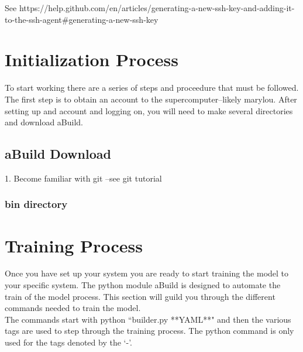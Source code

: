\documentclass{article}
\begin{document}
See https://help.github.com/en/articles/generating-a-new-ssh-key-and-adding-it-to-the-ssh-agent\#generating-a-new-ssh-key

\section{Initialization Process}
To start working there are a series of steps and proceedure that must
be followed. The first step is to obtain an account to the supercomputer--likely
marylou. After setting up and account and logging on, you will need to
make several directories and download aBuild.  
\subsection{aBuild Download}
1. Become familiar with git --see git tutorial

\subsubsection{bin directory}


\section{Training Process}                      
Once you have set up your system you are ready to start training the
model to your specific system. The python module aBuild is designed to
automate the train of the model process. This section will guild you
through the different commands needed to train the model.\\

The commands start with python ``builder.py **YAML**" and then the
various tags are used to step through the training process. The python
command is only used for the tags denoted by the `-'.
\end{document}
